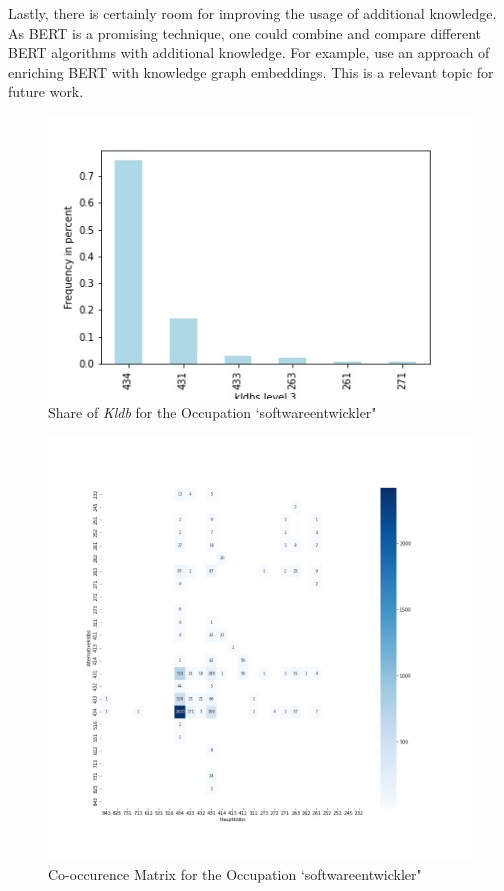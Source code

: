 \documentclass[12pt, a4paper, titlepage]{article}
\begin{document}
Lastly, there is certainly room for improving the usage of additional knowledge. As \ac{BERT} is a promising technique, one could combine and compare different \ac{BERT} algorithms with additional knowledge. For example, \citet{ostendorff2019} use an approach of enriching \ac{BERT} with knowledge graph embeddings. This is a relevant topic for future work. 

\begin{figure}[hb!]
  \center
  \includegraphics[scale=0.5]{kldbs_frequency_softwareentwickler.jpg}
  \caption{\label{fig: F27} Share of \textit{Kldb} for the Occupation `softwareentwickler"}
\end{figure}

\begin{figure}[hb!]
  \center
  \includegraphics[scale=0.4]{co_occurence_softwareentwickler.jpg}
  \caption{\label{fig: F28} Co-occurence Matrix for the Occupation `softwareentwickler"}
\end{figure}
\end{document}
